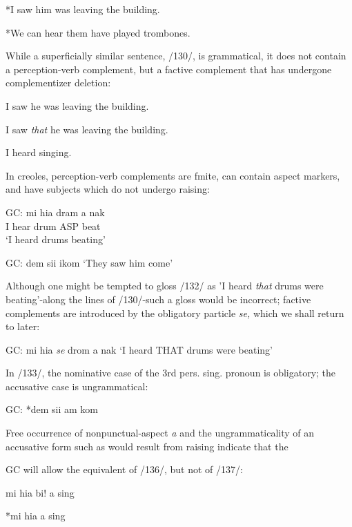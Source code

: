 \ea\label{ex:2:128}
 *I saw him was leaving the building.
\z

\ea\label{ex:2:129}
 *We can hear them have played trombones.
\z

While a superficially similar sentence, /130/, is grammatical, it does not contain a perception-verb complement, but a factive complement that has undergone complementizer deletion:

  


 


\ea\label{ex:2:130}
 I saw he was leaving the building.
\z

\ea\label{ex:2:131}
 I saw \textit{that} he was leaving the building.
\z

\ea\label{ex:2:137}
 I heard singing.
\z

In creoles, perception-verb complements are fmite, can contain aspect markers, and have subjects which do not undergo raising:

\ea\label{ex:2:132}
\gll  GC: mi hia dram a nak\\
I hear drum ASP beat\\
\glt `I heard drums beating'
\z




\ea\label{ex:2:133}
 GC: dem sii ikom
\glt `They saw him come'
\z



Although one might be tempted to gloss /132/ as 'I heard \textit{that} drums were beating'{}-along the lines of /130/{}-such a gloss would be incorrect;
factive complements are introduced by the obligatory particle \textit{se,}
which we shall return to later:

\ea\label{ex:2:134}
 GC: mi hia \textit{se} drom a nak
\glt `I heard THAT drums were beating'
\z



In /133/, the nominative case of the 3rd pers. sing. pronoun is obliga\-tory; the accusative case is ungrammatical:

\ea\label{ex:2:135}
 GC: *dem sii am kom
\z

Free occurrence of nonpunctual-aspect \textit{a} and the ungrammaticality of an accusative form such as would result from raising indicate that the

GC will allow the equivalent of /136/, but not of /137/:

\ea\label{ex:2:138}
 mi hia bi! a sing
\z

\ea\label{ex:2:139}
 *mi hia a sing
\z

